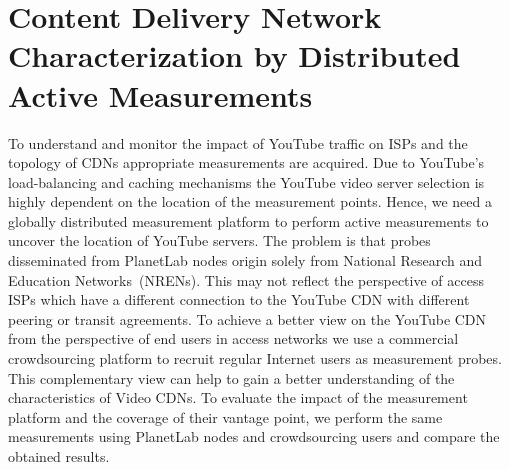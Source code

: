\section{Content Delivery Network Characterization by Distributed Active Measurements}\label{sec:aslevel:crowd}


To understand and monitor the impact of YouTube traffic on ISPs and the topology of CDNs appropriate measurements are acquired. Due to YouTube's load-balancing and caching mechanisms the YouTube video server selection is highly dependent on the location of the measurement points. Hence, we need a globally distributed measurement platform to perform active measurements to uncover the location of YouTube servers.
The problem is that probes disseminated from PlanetLab nodes origin solely from National Research and Education Networks~(NRENs). This may not reflect the perspective of access ISPs which have a different connection to the YouTube CDN with different peering or transit agreements.
To achieve a better view on the YouTube CDN from the perspective of end users in access networks we use a commercial crowdsourcing platform to recruit regular Internet users as measurement probes.
This complementary view can help to gain a better understanding of the characteristics of Video CDNs.
To evaluate the impact of the measurement platform and the coverage of their vantage point,  we perform the same measurements using PlanetLab nodes and crowdsourcing users and compare the obtained results.

